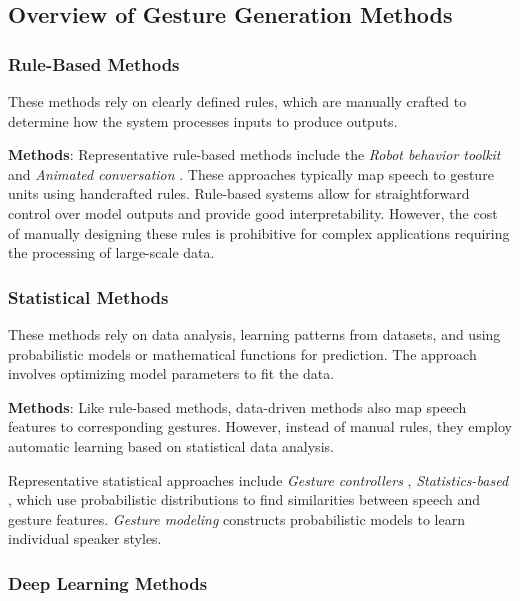 \subsection{Overview of Gesture Generation Methods}
\label{sec:relatedwork}

\subsubsection{Rule-Based Methods}

These methods rely on clearly defined rules, which are manually crafted to determine how the system processes inputs to produce outputs.

\textbf{Methods}: Representative rule-based methods include the \textit{Robot behavior toolkit} \cite{huang2012robot} and \textit{Animated conversation} \cite{cassell1994animated}. These approaches typically map speech to gesture units using handcrafted rules. Rule-based systems allow for straightforward control over model outputs and provide good interpretability.  
However, the cost of manually designing these rules is prohibitive for complex applications requiring the processing of large-scale data.

\subsubsection{Statistical Methods}

These methods rely on data analysis, learning patterns from datasets, and using probabilistic models or mathematical functions for prediction. The approach involves optimizing model parameters to fit the data.


\textbf{Methods}: Like rule-based methods, data-driven methods also map speech features to corresponding gestures. However, instead of manual rules, they employ automatic learning based on statistical data analysis.

Representative statistical approaches include \textit{Gesture controllers} \cite{levine2010gesture}, \textit{Statistics-based} \cite{yang2020statistics}, which use probabilistic distributions to find similarities between speech and gesture features. \textit{Gesture modeling} \cite{neff2008gesture} constructs probabilistic models to learn individual speaker styles.

\subsubsection{Deep Learning Methods}

